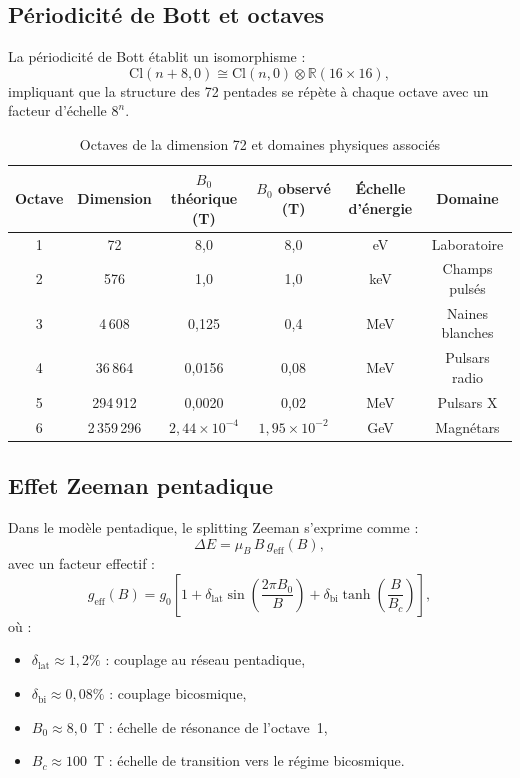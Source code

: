 \documentclass[11pt,a4paper]{article}
\theoremstyle{plain}
\theoremstyle{definition}
\theoremstyle{remark}
\begin{document}
\subsection{Périodicité de Bott et octaves}

La périodicité de Bott \cite{bott1959stable} établit un isomorphisme :
\begin{equation}
  \mathrm{Cl}(n+8,0) \cong \mathrm{Cl}(n,0) \otimes \mathbb{R}(16\times 16),
\end{equation}
impliquant que la structure des 72 pentades se répète à chaque octave avec un facteur d'échelle $8^n$.

\begin{table}[H]
\centering
\caption{Octaves de la dimension 72 et domaines physiques associés}
\label{tab:octaves}
\begin{tabular}{cccccc}
\toprule
Octave & Dimension & $B_0$ théorique (T) & $B_0$ observé (T) & Échelle d'énergie & Domaine \\
\midrule
1 & 72 & 8,0 & 8,0 & eV & Laboratoire \\
2 & 576 & 1,0 & 1,0 & keV & Champs pulsés \\
3 & 4\,608 & 0,125 & 0,4 & MeV & Naines blanches \\
4 & 36\,864 & 0,0156 & 0,08 & MeV & Pulsars radio \\
5 & 294\,912 & 0,0020 & 0,02 & MeV & Pulsars X \\
6 & 2\,359\,296 & $2,44\times10^{-4}$ & $1,95\times10^{-2}$ & GeV & Magnétars \\
\bottomrule
\end{tabular}
\end{table}

\subsection{Effet Zeeman pentadique}

Dans le modèle pentadique, le splitting Zeeman s'exprime comme :
\begin{equation}
  \Delta E = \mu_B \, B \, g_{\mathrm{eff}}(B),
\end{equation}
avec un facteur effectif :
\begin{equation}
  g_{\mathrm{eff}}(B) = g_0 \left[ 1 + \delta_{\mathrm{lat}} \sin\left(\frac{2\pi B_0}{B}\right) + \delta_{\mathrm{bi}} \tanh\left(\frac{B}{B_c}\right) \right],
  \label{eq:geff}
\end{equation}
où :
\begin{itemize}
  \item $\delta_{\mathrm{lat}} \approx 1,2\%$ : couplage au réseau pentadique,
  \item $\delta_{\mathrm{bi}} \approx 0,08\%$ : couplage bicosmique,
  \item $B_0 \approx 8,0$~T : échelle de résonance de l'octave~1,
  \item $B_c \approx 100$~T : échelle de transition vers le régime bicosmique.
\end{itemize}
\end{document}
